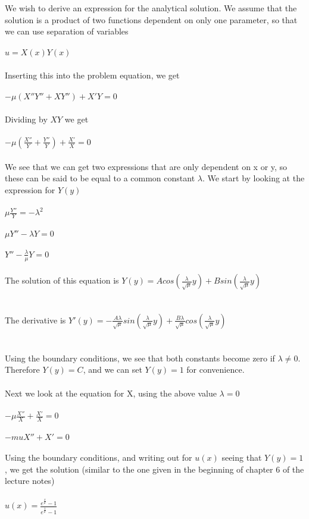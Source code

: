 \documentclass[a4paper,english,12pt,twoside]{article}
\begin{document}
We wish to derive an expression for the analytical solution. We assume that the solution is a product of two functions dependent on only one parameter, so that we can use separation of variables\\
\\
$u = X(x)Y(x)$\\
\\
Inserting this into the problem equation, we get\\
\\
$\displaystyle -\mu(X''Y'' + XY'') + X'Y = 0$\\
\\
Dividing by $XY$ we get\\
\\
$\displaystyle -\mu\left(\frac{X''}{Y} + \frac{Y''}{Y}\right) + \frac{X'}{X} = 0$\\
\\
We see that we can get two expressions that are only dependent on x or y, so these can be said to be equal to a common constant $\lambda$. We start by looking at the expression for $Y(y)$\\
\\
$\displaystyle \mu\frac{Y''}{Y} = -\lambda^2$\\
\\
$\displaystyle \mu Y''- \lambda Y = 0$\\
\\
$\displaystyle Y''-\frac{\lambda}{\mu}Y = 0$\\
\\
The solution of this equation is $\displaystyle Y(y) = Acos\left(\frac{\lambda}{\sqrt{\mu}}y\right) + Bsin\left(\frac{\lambda}{\sqrt{\mu}}y\right)$\\
\\
\\
The derivative is $\displaystyle Y'(y) = -\frac{A\lambda}{\sqrt{\mu}} sin\left(\frac{\lambda}{\sqrt{\mu}}y\right) + \frac{B\lambda}{\sqrt{\mu}} cos\left(\frac{\lambda}{\sqrt{\mu}}y\right) $\\
\\
\\
Using the boundary conditions, we see that both constants become zero if $\lambda \neq 0$. Therefore $Y(y) = C$, and we can set $Y(y) = 1$ for convenience.\\
\\
Next we look at the equation for X, using the above value $\lambda = 0$\\
\\
$-\mu\frac{X''}{X} + \frac{X'}{X} = 0$\\
\\
$-mu X'' + X' = 0$\\
\\
Using the boundary conditions, and writing out for $u(x)$ seeing that $Y(y) = 1$, we get the solution (similar to the one given in the beginning of chapter 6 of the lecture notes)\\
\\
$\displaystyle u(x) = \frac{e^\frac{x}{\mu} - 1}{e^\frac{1}{\mu} - 1}$
\end{document}
